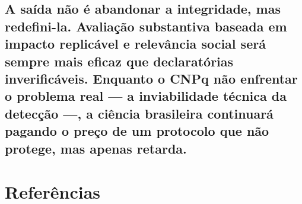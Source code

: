 \documentclass[
  12pt,
  a4paper,
  brazil
]{article}
\begin{document}
\subsection{A saída não é abandonar a integridade, mas redefini-la.
Avaliação substantiva baseada em impacto replicável e relevância social
será sempre mais eficaz que declaratórias inverificáveis. Enquanto o
CNPq não enfrentar o problema real --- a inviabilidade técnica da
detecção ---, a ciência brasileira continuará pagando o preço de um
protocolo que não protege, mas apenas
retarda.}\label{a-sauxedda-nuxe3o-uxe9-abandonar-a-integridade-mas-redefini-la.-avaliauxe7uxe3o-substantiva-baseada-em-impacto-replicuxe1vel-e-relevuxe2ncia-social-seruxe1-sempre-mais-eficaz-que-declaratuxf3rias-inverificuxe1veis.-enquanto-o-cnpq-nuxe3o-enfrentar-o-problema-real-a-inviabilidade-tuxe9cnica-da-detecuxe7uxe3o-a-ciuxeancia-brasileira-continuaruxe1-pagando-o-preuxe7o-de-um-protocolo-que-nuxe3o-protege-mas-apenas-retarda.}

\section{Referências}\label{referuxeancias}
\end{document}
